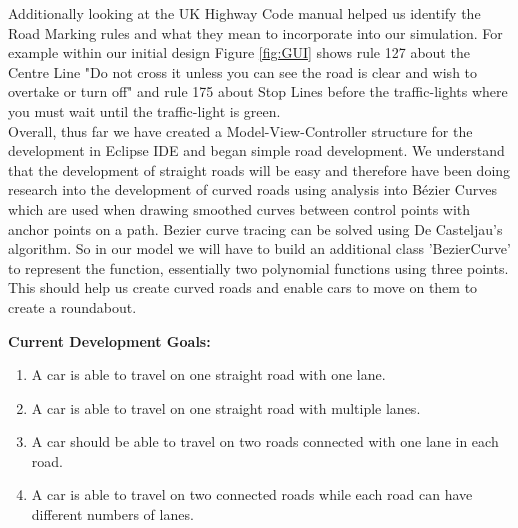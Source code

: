 \documentclass[a4paper,11pt]{article}
\begin{document}
Additionally looking at the UK Highway Code manual helped us identify the Road Marking rules and what they mean to  incorporate into our simulation. For example within our initial design Figure \ref{fig:GUI} shows rule 127 about the Centre Line "Do not cross it unless you can see the road is clear and wish to overtake or turn off" and rule 175 about Stop Lines before the traffic-lights where you must wait until the traffic-light is green.\\Overall, thus far we have created a Model-View-Controller structure for the development in Eclipse IDE and began simple road development. We understand that the development of straight roads will be easy and therefore have been doing research into the development of curved roads using analysis into Bézier Curves which are used when drawing smoothed curves between control points with anchor points on a path. Bezier curve tracing can be solved using De Casteljau's algorithm. So in our model we will have to build an additional class 'BezierCurve' to represent the function, essentially two polynomial functions using three points. This should help us create curved roads and enable cars to move on them to create a roundabout.

\textbf{Current Development Goals:}
\begin{enumerate}
	\item A car is able to travel on one straight road with one lane.
	\item A car is able to travel on one straight road with multiple lanes.
	\item A car should be able to travel on two roads connected with one lane in each road.
	\item A car is able to travel on two connected roads while each road can have different numbers of lanes.
\end{enumerate}
\end{document}
